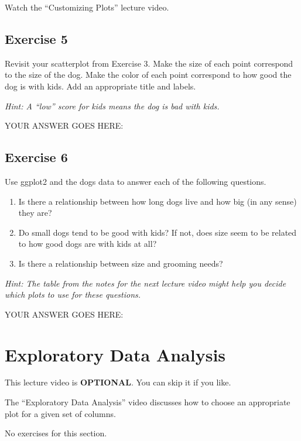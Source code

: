 \documentclass[
]{article}
\begin{document}
Watch the ``Customizing Plots'' lecture video.

\hypertarget{exercise-5}{%
\subsection{Exercise 5}\label{exercise-5}}

Revisit your scatterplot from Exercise 3. Make the size of each point
correspond to the size of the dog. Make the color of each point
correspond to how good the dog is with kids. Add an appropriate title
and labels.

\emph{Hint: A ``low'' score for kids means the dog is bad with kids.}

YOUR ANSWER GOES HERE:

\hypertarget{exercise-6}{%
\subsection{Exercise 6}\label{exercise-6}}

Use ggplot2 and the dogs data to answer each of the following questions.

\begin{enumerate}
\def\labelenumi{\arabic{enumi}.}
\item
  Is there a relationship between how long dogs live and how big (in any
  sense) they are?
\item
  Do small dogs tend to be good with kids? If not, does size seem to be
  related to how good dogs are with kids at all?
\item
  Is there a relationship between size and grooming needs?
\end{enumerate}

\emph{Hint: The table from the notes for the next lecture video might
help you decide which plots to use for these questions.}

YOUR ANSWER GOES HERE:

\hypertarget{exploratory-data-analysis}{%
\section{Exploratory Data Analysis}\label{exploratory-data-analysis}}

This lecture video is \textbf{OPTIONAL}. You can skip it if you like.

The ``Exploratory Data Analysis'' video discusses how to choose an
appropriate plot for a given set of columns.

No exercises for this section.
\end{document}

